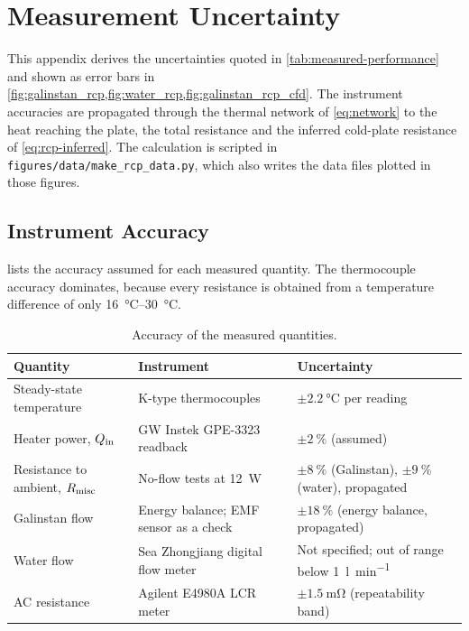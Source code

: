 \chapter{Measurement Uncertainty}
\label{app:uncertainty}

This appendix derives the uncertainties quoted in \cref{tab:measured-performance}
and shown as error bars in \cref{fig:galinstan_rcp,fig:water_rcp,fig:galinstan_rcp_cfd}.
The instrument accuracies are propagated through the thermal network of
\cref{eq:network} to the heat reaching the plate, the total resistance and the
inferred cold-plate resistance of \cref{eq:rcp-inferred}. The calculation is
scripted in \texttt{figures/data/make\_rcp\_data.py}, which also writes the data
files plotted in those figures.

\section{Instrument Accuracy}

 lists the accuracy assumed for each measured
quantity. The thermocouple accuracy dominates, because every resistance is
obtained from a temperature difference of only \SIrange{16}{30}{\celsius}.

\begin{table}[htbp]
  \centering
  \caption{Accuracy of the measured quantities.}
  \label{tab:app-instruments}
  \small
  \begin{tabularx}{\linewidth}{@{}>{\raggedright\arraybackslash}p{3.3cm}
      >{\raggedright\arraybackslash}p{4.2cm} L@{}}
    \toprule
    Quantity & Instrument & Uncertainty \\
    \midrule
    Steady-state temperature & K-type thermocouples
      & $\pm\SI{2.2}{\celsius}$ per reading~\cite{loh_project_2025} \\
    Heater power, $Q_{\mathrm{in}}$ & GW Instek GPE-3323 readback
      & $\pm\SI{2}{\percent}$ (assumed) \\
    Resistance to ambient, $R_{\mathrm{misc}}$ & No-flow tests at \SI{12}{\watt}
      & $\pm\SI{8}{\percent}$ (Galinstan), $\pm\SI{9}{\percent}$ (water),
        propagated \\
    Galinstan flow & Energy balance; EMF sensor as a check
      & $\pm\SI{18}{\percent}$ (energy balance, propagated) \\
    Water flow & Sea Zhongjiang digital flow meter
      & Not specified; out of range below \SI{1}{\litre\per\minute} \\
    AC resistance & Agilent E4980A LCR meter
      & $\pm\SI{1.5}{\milli\ohm}$ (repeatability band) \\
    \bottomrule
  \end{tabularx}
\end{table}

